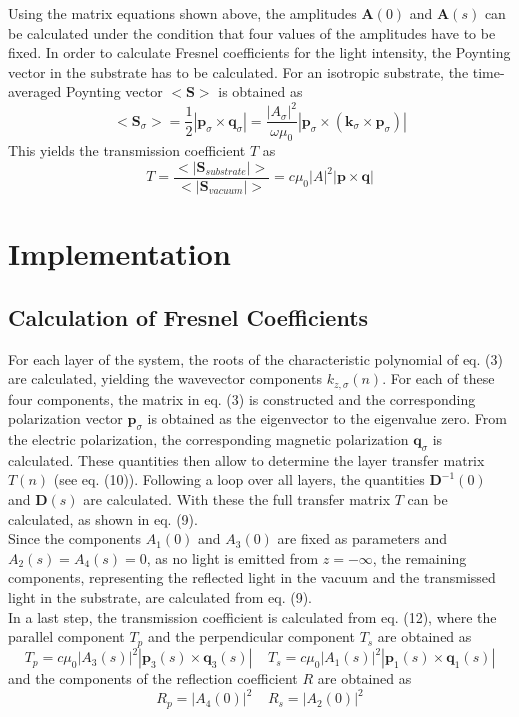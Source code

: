 \documentclass[11pt]{article}
\begin{document}
Using the matrix equations shown above, the amplitudes $\mathbf{A}(0)$ and $\mathbf{A}(s)$ can be calculated under the condition that four values of the amplitudes have to be fixed. 
In order to calculate Fresnel coefficients for the light intensity, the Poynting vector in the substrate has to be calculated. For an isotropic substrate, the time-averaged Poynting vector $<\mathbf{S}>$ is obtained as
\begin{equation}
<\mathbf{S}_{\sigma}>=\frac{1}{2}|\mathbf{p}_{\sigma}\times \mathbf{q}_{\sigma}|=\frac{|A_{\sigma}|^{2}}{\omega\mu_0}|\mathbf{p}_{\sigma}\times(\mathbf{k}_{\sigma}\times \mathbf{p}_{\sigma})|
\end{equation}
This yields the transmission coefficient $T$ as
\begin{equation}
T=\frac{<|\mathbf{S}_{substrate}|>}{<|\mathbf{S}_{vacuum}|>}=c\mu_0 |A|^2 |\mathbf{p}\times \mathbf{q}| 
\end{equation}
\section{Implementation}
\subsection{Calculation of Fresnel Coefficients}
For each layer of the system, the roots of the characteristic polynomial of eq. (3) are calculated, yielding the wavevector components $k_{z,\sigma}(n)$. For each of these four components, the matrix in eq. (3) is constructed and the corresponding polarization vector $\mathbf{p}_{\sigma}$ is obtained as the eigenvector to the eigenvalue zero. From the electric polarization, the corresponding magnetic polarization $\mathbf{q}_{\sigma}$ is calculated.
These quantities then allow to determine the layer transfer matrix $T(n)$ (see eq. (10)). Following a loop over all layers, the quantities $\mathbf{D}^{-1}(0)$ and $\mathbf{D}(s)$ are calculated. With these the full transfer matrix $T$ can be calculated, as shown in eq. (9). \\
Since the components $A_1(0)$ and $A_3(0)$ are fixed as parameters and $A_2(s)=A_4(s)=0$, as no light is emitted from $z=-\infty$, the remaining components, representing the reflected light in the vacuum and the transmissed light in the substrate, are calculated from eq. (9).\\
In a last step, the transmission coefficient is calculated from eq. (12), where the parallel component $T_{p}$ and the perpendicular component $T_{s}$ are obtained as
\begin{equation}
T_{p}=c\mu_0 |A_3(s)|^2 |\mathbf{p}_3(s)\times \mathbf{q}_3(s)| \;\;\;\; T_{s}=c\mu_0 |A_1(s)|^2 |\mathbf{p}_1(s)\times \mathbf{q}_1(s)|
\end{equation}
and the components of the reflection coefficient $R$ are obtained as
\begin{equation}
R_p=|A_4(0)|^{2} \;\;\;\; R_s=|A_2(0)|^{2}
\end{equation}
\end{document}
